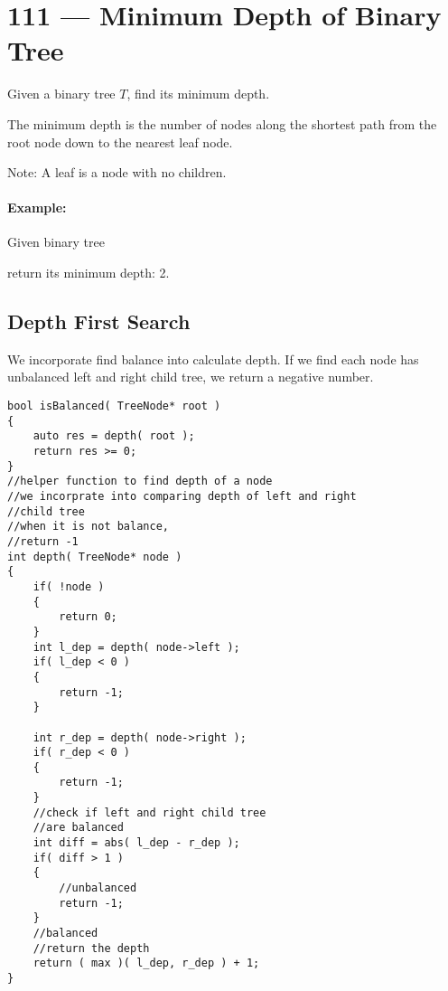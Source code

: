 \section{111 --- Minimum Depth of Binary Tree}
Given a binary tree $T$, find its minimum depth.
\par
The minimum depth is the number of nodes along the shortest path from the root node down to the nearest leaf node.
\par
Note: A leaf is a node with no children.
\paragraph{Example:}
\begin{flushleft}
Given binary tree
\begin{figure}[H]
\end{figure}
return its minimum depth: 2.
\end{flushleft}
\subsection{Depth First Search}
We incorporate find balance into calculate depth. If we find each node has unbalanced left and right child tree, we return a negative number.

\setcounter{lstlisting}{0}
\begin{lstlisting}[style=customc, caption={DFS}]
bool isBalanced( TreeNode* root )
{
    auto res = depth( root );
    return res >= 0;
}
//helper function to find depth of a node
//we incorprate into comparing depth of left and right
//child tree
//when it is not balance,
//return -1
int depth( TreeNode* node )
{
    if( !node )
    {
        return 0;
    }
    int l_dep = depth( node->left );
    if( l_dep < 0 )
    {
        return -1;
    }

    int r_dep = depth( node->right );
    if( r_dep < 0 )
    {
        return -1;
    }
    //check if left and right child tree
    //are balanced
    int diff = abs( l_dep - r_dep );
    if( diff > 1 )
    {
        //unbalanced
        return -1;
    }
    //balanced
    //return the depth
    return ( max )( l_dep, r_dep ) + 1;
}
\end{lstlisting}
